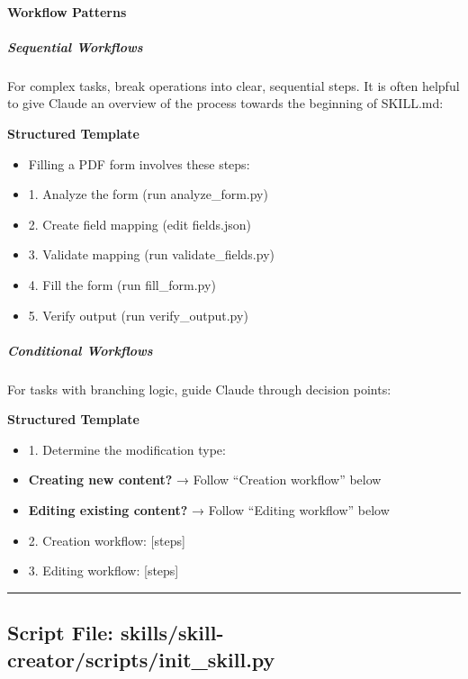 \documentclass[11pt]{article}
\begin{document}
\paragraph{Workflow Patterns}\mbox{}\par

\subparagraph{Sequential Workflows}\mbox{}\par

For complex tasks, break operations into clear, sequential steps. It is often helpful to give Claude an overview of the process towards the beginning of SKILL.md:


\textbf{Structured Template}
\begin{itemize}[leftmargin=*,itemsep=2pt,topsep=2pt]
\item {} Filling a PDF form involves these steps:
\item {} 1. Analyze the form (run analyze\_\allowbreak{}form.py)
\item {} 2. Create field mapping (edit fields.json)
\item {} 3. Validate mapping (run validate\_\allowbreak{}fields.py)
\item {} 4. Fill the form (run fill\_\allowbreak{}form.py)
\item {} 5. Verify output (run verify\_\allowbreak{}output.py)
\end{itemize}

\subparagraph{Conditional Workflows}\mbox{}\par

For tasks with branching logic, guide Claude through decision points:


\textbf{Structured Template}
\begin{itemize}[leftmargin=*,itemsep=2pt,topsep=2pt]
\item {} 1. Determine the modification type:
\item {} \textbf{Creating new content?} → Follow ``Creation workflow'' below
\item {} \textbf{Editing existing content?} → Follow ``Editing workflow'' below
\item {} 2. Creation workflow: [steps]
\item {} 3. Editing workflow: [steps]
\end{itemize}

\vspace{0.8em}\hrule\vspace{0.8em}

\subsection{Script File: skills/skill-creator/scripts/init\_\allowbreak{}skill.py}\label{file:skills-skill-creator-scripts-init-skill-py}
\end{document}
